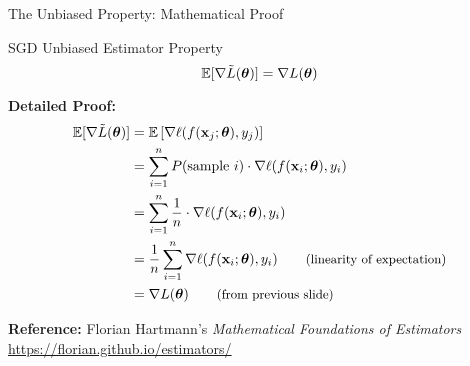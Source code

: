 \documentclass[usenames,dvipsnames]{beamer}
\newcommand{\E}{\mathbb{E}}
\begin{document}
  \begin{frame}{The Unbiased Property: Mathematical Proof}
    \begin{theorembox}{SGD Unbiased Estimator Property}
    $$\E[\nabla \tilde{L}(\vtheta)] = \nabla L(\vtheta)$$
    \end{theorembox}

    \pause
    \textbf{Detailed Proof:}
    \begin{align}
    \E[\nabla \tilde{L}(\vtheta)] &= \E\left[\nabla \ell(f(\vx_j;\vtheta),y_j)\right]\\
    &= \sum_{i=1}^n P(\text{sample } i) \cdot \nabla \ell(f(\vx_i;\vtheta),y_i)\\
    &= \sum_{i=1}^n \frac{1}{n} \cdot \nabla \ell(f(\vx_i;\vtheta),y_i)\\
    &= \frac{1}{n}\sum_{i=1}^n \nabla \ell(f(\vx_i;\vtheta),y_i) \qquad \text{\small (linearity of expectation)}\\
    &= \nabla L(\vtheta) \qquad \text{\small (from previous slide)}
    \end{align}

    \pause
    \textbf{Reference:} Florian Hartmann's \emph{Mathematical Foundations of Estimators} \\
    \url{https://florian.github.io/estimators/}
  \end{frame}
\end{document}
